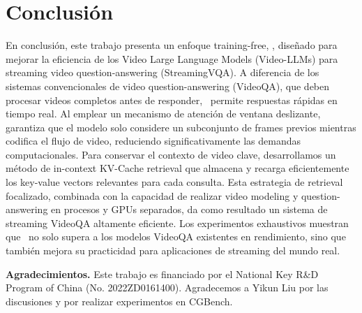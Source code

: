 \section{Conclusión}
\label{sec:conclusions}

En conclusión, este trabajo presenta un enfoque training-free, \ourmethod, diseñado para mejorar la eficiencia de los Video Large Language Models (Video-LLMs) para streaming video question-answering (StreamingVQA). 
A diferencia de los sistemas convencionales de video question-answering (VideoQA), que deben procesar videos completos antes de responder, \ourmethod~permite respuestas rápidas en tiempo real. 
Al emplear un mecanismo de atención de ventana deslizante, garantiza que el modelo solo considere un subconjunto de frames previos mientras codifica el flujo de video, reduciendo significativamente las demandas computacionales. Para conservar el contexto de video clave, desarrollamos un método de in-context KV-Cache retrieval que almacena y recarga eficientemente los key-value vectors relevantes para cada consulta. Esta estrategia de retrieval focalizado, combinada con la capacidad de realizar video modeling y question-answering en procesos y GPUs separados, da como resultado un sistema de streaming VideoQA altamente eficiente. Los experimentos exhaustivos muestran que \ourmethod~no solo supera a los modelos VideoQA existentes en rendimiento, sino que también mejora su practicidad para aplicaciones de streaming del mundo real.

\vspace{5pt}

\textbf{Agradecimientos.}
Este trabajo es financiado por el National Key R\&D Program of China (No. 2022ZD0161400).
Agradecemos a Yikun Liu por las discusiones y por realizar experimentos en CGBench.
